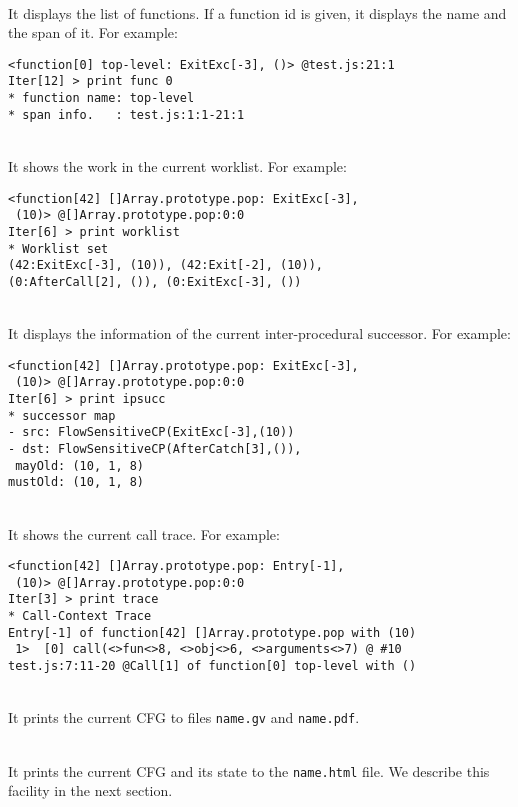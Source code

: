 \medskip\noindent
{}\\[.2em]
It displays the list of functions.
If a function id is given, it displays the name and the span of it.
For example:
{\small
\begin{verbatim}
<function[0] top-level: ExitExc[-3], ()> @test.js:21:1
Iter[12] > print func 0
* function name: top-level
* span info.   : test.js:1:1-21:1
\end{verbatim}
}

\medskip\noindent
{}\\[.2em]
It shows the work in the current worklist.  For example:
{\small
\begin{verbatim}
<function[42] []Array.prototype.pop: ExitExc[-3],
 (10)> @[]Array.prototype.pop:0:0
Iter[6] > print worklist
* Worklist set
(42:ExitExc[-3], (10)), (42:Exit[-2], (10)),
(0:AfterCall[2], ()), (0:ExitExc[-3], ())
\end{verbatim}
}

\medskip\noindent
{}\\[.2em]
It displays the information of the current inter-procedural successor.
For example:
{\small
\begin{verbatim}
<function[42] []Array.prototype.pop: ExitExc[-3],
 (10)> @[]Array.prototype.pop:0:0
Iter[6] > print ipsucc
* successor map
- src: FlowSensitiveCP(ExitExc[-3],(10))
- dst: FlowSensitiveCP(AfterCatch[3],()),
 mayOld: (10, 1, 8)
mustOld: (10, 1, 8)
\end{verbatim}
}

\medskip\noindent
{}\\[.2em]
It shows the current call trace.  For example:
{\small
\begin{verbatim}
<function[42] []Array.prototype.pop: Entry[-1],
 (10)> @[]Array.prototype.pop:0:0
Iter[3] > print trace
* Call-Context Trace
Entry[-1] of function[42] []Array.prototype.pop with (10)
 1>  [0] call(<>fun<>8, <>obj<>6, <>arguments<>7) @ #10
test.js:7:11-20 @Call[1] of function[0] top-level with ()
\end{verbatim}
}

\medskip\noindent
{}\\[.2em]
It prints the current CFG to files \verb!name.gv! and \verb!name.pdf!.

\medskip\noindent
{}\\[.2em]
It prints the current CFG and its state to the \verb!name.html! file.
We describe this facility in the next section.


